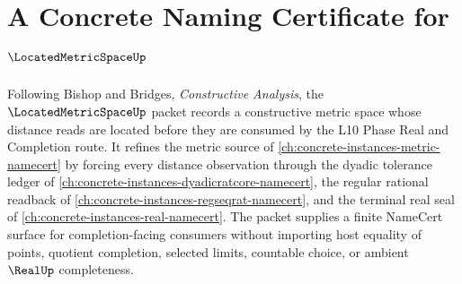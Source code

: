 \chapter{A Concrete Naming Certificate for $\LocatedMetricSpaceUp$}
\label{ch:concrete-instances-located-metric-space-namecert}

Following Bishop and Bridges, \emph{Constructive Analysis}, the $\LocatedMetricSpaceUp$ packet records a constructive metric space whose distance reads are located before they are consumed by the L10 Phase Real and Completion route. It refines the metric source of \autoref{ch:concrete-instances-metric-namecert} by forcing every distance observation through the dyadic tolerance ledger of \autoref{ch:concrete-instances-dyadicratcore-namecert}, the regular rational readback of \autoref{ch:concrete-instances-regseqrat-namecert}, and the terminal real seal of \autoref{ch:concrete-instances-real-namecert}. The packet supplies a finite NameCert surface for completion-facing consumers without importing host equality of points, quotient completion, selected limits, countable choice, or ambient $\RealUp$ completeness.

